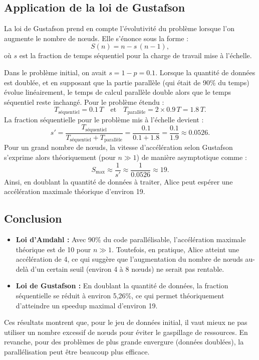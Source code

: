 \documentclass[a4paper,13pt]{book}
\begin{document}
\subsection{Application de la loi de Gustafson}

La loi de Gustafson prend en compte l’évolutivité du problème lorsque l’on augmente le nombre de nœuds. Elle s’énonce sous la forme :
\[
S(n) = n - s \,(n-1),
\]
où \(s\) est la fraction de temps séquentiel pour la charge de travail mise à l'échelle.

Dans le problème initial, on avait \(s = 1-p = 0.1\). Lorsque la quantité de données est doublée, et en supposant que la partie parallèle (qui était de 90\% du temps) évolue linéairement, le temps de calcul parallèle double alors que le temps séquentiel reste inchangé. Pour le problème étendu :
\[
T_{\text{séquentiel}} = 0.1\,T \quad \text{et} \quad T_{\text{parallèle}} = 2 \times 0.9\,T = 1.8\,T.
\]
La fraction séquentielle pour le problème mis à l'échelle devient :
\[
s' = \frac{T_{\text{séquentiel}}}{T_{\text{séquentiel}} + T_{\text{parallèle}}} = \frac{0.1}{0.1+1.8} = \frac{0.1}{1.9} \approx 0.0526.
\]
Pour un grand nombre de nœuds, la vitesse d’accélération selon Gustafson s’exprime alors théoriquement (pour \( n \gg 1 \)) de manière asymptotique comme :
\[
S_{\max} \approx \frac{1}{s'} \approx \frac{1}{0.0526} \approx 19.
\]
Ainsi, en doublant la quantité de données à traiter, Alice peut espérer une accélération maximale théorique d’environ 19.

\subsection{Conclusion}

\begin{itemize}
    \item \textbf{Loi d’Amdahl :} Avec 90\% du code parallélisable, l’accélération maximale théorique est de 10 pour \( n \gg 1 \). Toutefois, en pratique, Alice atteint une accélération de 4, ce qui suggère que l’augmentation du nombre de nœuds au-delà d’un certain seuil (environ 4 à 8 nœuds) ne serait pas rentable.
    \item \textbf{Loi de Gustafson :} En doublant la quantité de données, la fraction séquentielle se réduit à environ 5,26\%, ce qui permet théoriquement d’atteindre un speedup maximal d’environ 19.
\end{itemize}

Ces résultats montrent que, pour le jeu de données initial, il vaut mieux ne pas utiliser un nombre excessif de nœuds pour éviter le gaspillage de ressources. En revanche, pour des problèmes de plus grande envergure (données doublées), la parallélisation peut être beaucoup plus efficace.
\end{document}
